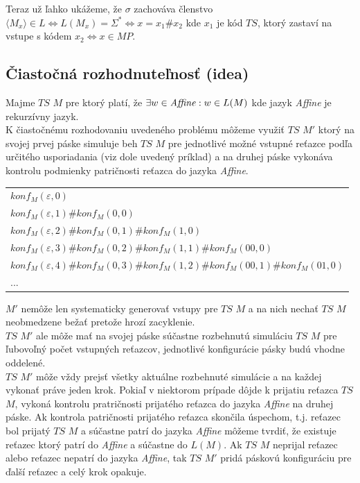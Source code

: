 \documentclass[11pt,a4paper]{article}
\begin{document}
Teraz už ľahko ukážeme, že $\sigma$ zachováva členstvo $\langle M_{x} \rangle \in L \Leftrightarrow L(M_x) = \Sigma^{*} \Leftrightarrow x=x_1\#x_2$ kde $x_1$ je kód $TS$, ktorý zastaví na vstupe s kódem $x_2 \Leftrightarrow x \in MP$.

\newpage
\subsection{Čiastočná rozhodnuteľnosť (idea)}

Majme $TS$ $M$ pre ktorý platí, že $\exists w \in \text{\textit{Affine}}: w \in L(M)$ kde jazyk \textit{Affine} je rekurzívny jazyk.\\

K čiastočnému rozhodovaniu uvedeného problému môžeme využiť $TS$ $M'$ ktorý na svojej prvej páske simuluje beh $TS$ $M$ pre jednotlivé možné vstupné reťazce podľa určitého usporiadania (viz dole uvedený príklad) a na druhej páske vykonáva kontrolu podmienky patričnosti reťazca do jazyka \textit{Affine}.

\begin{center}
    \begin{tabular}{l}
        $konf_M(\varepsilon,0)$\\
        $konf_M(\varepsilon,1)\#konf_M(0,0)$\\
        $konf_M(\varepsilon,2)\#konf_M(0,1)\#konf_M(1,0)$\\
        $konf_M(\varepsilon,3)\#konf_M(0,2)\#konf_M(1,1)\#konf_M(00,0)$\\
        $konf_M(\varepsilon,4)\#konf_M(0,3)\#konf_M(1,2)\#konf_M(00,1)\#konf_M(01,0)$\\
        ...
    \end{tabular}
\end{center}

$M'$ nemôže len systematicky generovať vstupy pre $TS$ $M$ a na nich nechať $TS$ $M$ neobmedzene bežať pretože hrozí zacyklenie.\\

$TS$ $M'$ ale môže mať na svojej páske súčastne rozbehnutú simuláciu $TS$ $M$ pre ľubovoľný počet vstupných reťazcov, jednotlivé konfigurácie pásky budú vhodne oddelené.\\

$TS$ $M'$ môže vždy prejsť všetky aktuálne rozbehnuté simulácie a na každej vykonať práve jeden krok.
Pokiaľ v niektorom prípade dôjde k prijatiu reťazca $TS$ $M$, vykoná kontrolu pratričnosti prijatého reťazca do jazyka \textit{Affine} na druhej páske. Ak kontrola patričnosti prijatého reťazca skončila úspechom, t.j. reťazec bol prijatý $TS$ $M$ a súčastne patrí do jazyka \textit{Affine} môžeme tvrdiť, že existuje reťazec ktorý patrí do \textit{Affine} a súčastne do $L(M)$. Ak $TS$ $M$ neprijal reťazec alebo reťazec nepatrí do jazyka \textit{Affine}, tak $TS$ $M'$ pridá páskovú konfiguráciu pre ďalší reťazec a celý krok opakuje.\\
\end{document}
